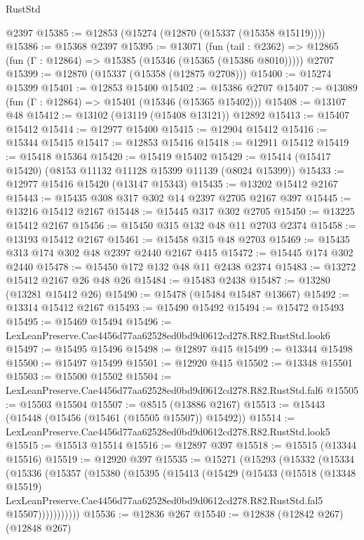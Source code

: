 \begin{lexlean}{RustStd}
\begin{coremodule}
    @2397
@15385 := @12853 (@15274 (@12870 (@15337 (@15358 @15119))))
@15386 := @15368 @2397
@15395 := @13071
    (fun (tail : @2362) => @12865 (fun (Γ : @12864) => @15385 (@15346 (@15365 (@15386 @8010)))))
    @2707
@15399 := @12870 (@15337 (@15358 (@12875 @2708)))
@15400 := @15274 @15399
@15401 := @12853 @15400
@15402 := @15386 @2707
@15407 := @13089 (fun (Γ : @12864) => @15401 (@15346 (@15365 @15402)))
@15408 := @13107 @48
@15412 := @13102 (@13119 (@15408 @13121)) @12892
@15413 := @15407 @15412
@15414 := @12977 @15400
@15415 := @12904 @15412
@15416 := @15344 @15415
@15417 := @12853 @15416
@15418 := @12911 @15412
@15419 := @15418 @15364
@15420 := @15419 @15402
@15429 := @15414 (@15417 @15420) (@8153 @11132 @11128 @15399 @11139 (@8024 @15399))
@15433 := @12977 @15416 @15420 (@13147 @15343)
@15435 := @13202 @15412 @2167
@15443 := @15435 @308 @317 @302 @14 @2397 @2705 @2167 @397
@15445 := @13216 @15412 @2167
@15448 := @15445 @317 @302 @2705
@15450 := @13225 @15412 @2167
@15456 := @15450 @315 @132 @48 @11 @2703 @2374
@15458 := @13193 @15412 @2167
@15461 := @15458 @315 @48 @2703
@15469 := @15435 @313 @174 @302 @48 @2397 @2440 @2167 @415
@15472 := @15445 @174 @302 @2440
@15478 := @15450 @172 @132 @48 @11 @2438 @2374
@15483 := @13272 @15412 @2167 @26 @48 @26
@15484 := @15483 @2438
@15487 := @13280 (@13281 @15412 @26)
@15490 := @15478 (@15484 @15487 @13667)
@15492 := @13314 @15412 @2167
@15493 := @15490 @15492
@15494 := @15472 @15493
@15495 := @15469 @15494
@15496 := LexLeanPreserve.Cae4456d77aa62528ed0bd9d0612cd278.R82.RustStd.look6
@15497 := @15495 @15496
@15498 := @12897 @415
@15499 := @13344 @15498
@15500 := @15497 @15499
@15501 := @12920 @415
@15502 := @13348 @15501
@15503 := @15500 @15502
@15504 := LexLeanPreserve.Cae4456d77aa62528ed0bd9d0612cd278.R82.RustStd.fal6
@15505 := @15503 @15504
@15507 := @8515 (@13886 @2167)
@15513 := @15443 (@15448 (@15456 (@15461 (@15505 @15507)) @15492))
@15514 := LexLeanPreserve.Cae4456d77aa62528ed0bd9d0612cd278.R82.RustStd.look5
@15515 := @15513 @15514
@15516 := @12897 @397
@15518 := @15515 (@13344 @15516)
@15519 := @12920 @397
@15535 := @15271
    (@15293
      (@15332
        (@15334
          (@15336
            (@15357
              (@15380
                (@15395
                  (@15413
                    (@15429
                      (@15433
                        (@15518
                          (@13348 @15519)
                          LexLeanPreserve.Cae4456d77aa62528ed0bd9d0612cd278.R82.RustStd.fal5
                          @15507)))))))))))
@15536 := @12836 @267
@15540 := @12838 (@12842 @267) (@12848 @267)

\end{coremodule}
\end{lexlean}
